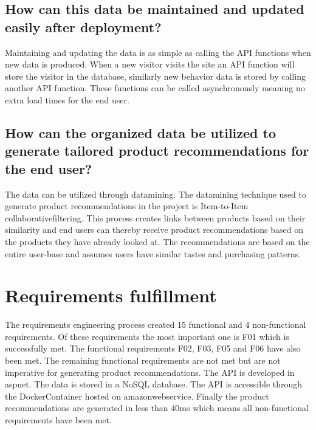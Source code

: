 \subsection{How can this data be maintained and updated easily after deployment?}
Maintaining and updating the data is as simple as calling the \gls{API} functions when new data is produced. When a new visitor visits the site an \gls{API} function will store the visitor in the database, similarly new behavior data is stored by calling another \gls{API} function. These functions can be called asynchronously meaning no extra load times for the end user.

\subsection{How can the organized data be utilized to generate tailored product recommendations for the end user?}
The data can be utilized through \gls{datamining}. The \gls{datamining} technique used to generate product recommendations in the project is Item-to-Item \gls{collaborativefiltering}. This process creates links between products based on their similarity and end users can thereby receive product recommendations based on the products they have already looked at. The recommendations are based on the entire user-base and assumes users have similar tastes and purchasing patterns.

\section{Requirements fulfillment}
The requirements engineering process created 15 functional and 4 non-functional requirements. Of these requirements the most important one is F01 which is successfully met. The functional requirements F02, F03, F05 and F06 have also been met. The remaining functional requirements are not met but are not imperative for generating product recommendations. The \gls{API} is developed in \gls{aspnet}. The data is stored in a \gls{NoSQL} database. The \gls{API} is accessible through the \gls{DockerContainer} hosted on \gls{amazonwebservice}. Finally the product recommendations are generated in less than 40ms which means all non-functional requirements have been met.
